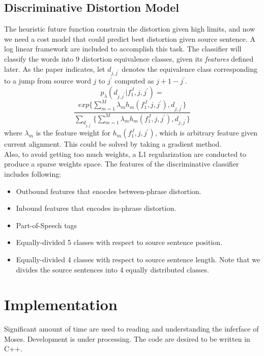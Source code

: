 \documentclass[11pt,letterpaper]{article}
\begin{document}
\subsection{Discriminative Distortion Model} %
\label{sub:discriminative_distortion_model}
The heuristic future function constrain the distortion given high limits, and now we need a cost model that could predict best distortion given source sentence. A log linear framework are included to accomplish this task. The classifier will classify the words into 9 distortion equivalence classes, given its \textit{features} defined later. As the paper indicates, let $d_{j,j^{\prime}}$ denotes the equivalence class corresponding to a jump from source word $j$ to $j^{\prime}$ computed as $j + 1 - j^{\prime}$.
\clearpage
$$ p_{\lambda}(d_{j,j^{\prime}}|f_1^J,j,j^{\prime}) =$$
$$\frac{exp\{ \sum_{m=1}^M \lambda_mh_m(f_1^J,j,j^{\prime}),d_{j,j^{\prime}}\}}{\sum_{d_{j,j^{\prime}}} \{\sum_{m=1}^M \lambda_mh_m(f_1^J,j,j^{\prime}),d_{j,j^{\prime}}\}}$$
where $\lambda_m$ is the feature weight for $h_m(f_1^J,j,j^{\prime})$, which is arbitrary feature given current alignment.
This could be solved by taking a gradient method.\\
Also, to avoid getting too much weights, a L1 regularization are conducted to produce a sparse weights space.
The features of the discriminative classifier includes following:
\begin{itemize}
	\item Outbound features that enocdes between-phrase distortion.
	\item Inbound features that encodes in-phrase distortion.
	\item Part-of-Speech tags
	\item Equally-divided 5 classes with respect to source sentence position.
	\item Equally-divided 4 classes with respect to source sentence length. Note that we divides the source sentences into 4 equally distributed classes.
\end{itemize}

\section{Implementation} %
\label{sec:implementation}
Significant amount of time are used to reading and understanding the inferface of Moses. Development is under processing. The code are desired to be written in C++.
\end{document}
